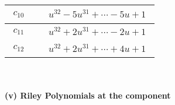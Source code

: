 \documentclass[1p]{elsarticle_modified}
\theoremstyle{definition}
\begin{document}
\begin{tabular}{m{50pt}|m{274pt}}
\hline $$\begin{aligned}c_{10}\end{aligned}$$&$\begin{aligned}
&u^{32}-5 u^{31}+\cdots-5 u+1
\end{aligned}$\\
\hline $$\begin{aligned}c_{11}\end{aligned}$$&$\begin{aligned}
&u^{32}+2 u^{31}+\cdots-2 u+1
\end{aligned}$\\
\hline $$\begin{aligned}c_{12}\end{aligned}$$&$\begin{aligned}
&u^{32}+2 u^{31}+\cdots+4 u+1
\end{aligned}$\\
\hline
\end{tabular}\\~\\
\newpage\renewcommand{\arraystretch}{1}
\flushleft \textbf{(v) Riley Polynomials at the component}\newline \\
\end{document}
